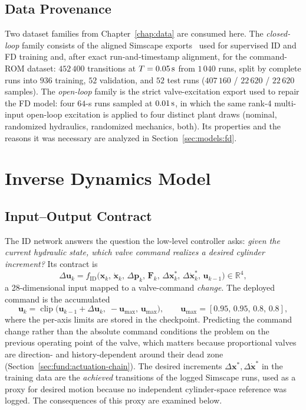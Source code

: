 \subsection{Data Provenance}

Two dataset families from Chapter~\ref{chap:data} are consumed here. The
\emph{closed-loop} family consists of the aligned Simscape
exports~\cite{mathworks2024simscape} used for supervised ID and FD training
and, after exact run-and-timestamp alignment, for the command-ROM dataset:
$452\,400$ transitions at $T=\unit[0.05]{s}$ from $1\,040$ runs, split by
complete runs into $936$ training, $52$ validation, and $52$ test runs
($407\,160$ / $22\,620$ / $22\,620$ samples). The \emph{open-loop} family is
the strict valve-excitation export used to repair the FD model: four $64$-s
runs sampled at $\unit[0.01]{s}$, in which the same rank-4 multi-input
open-loop excitation is applied to four distinct plant draws
(nominal, randomized hydraulics, randomized mechanics, both). Its properties
and the reasons it was necessary are analyzed in
Section~\ref{sec:models:fd}.

\section{Inverse Dynamics Model}
\label{sec:models:id}

\subsection{Input--Output Contract}

The ID network answers the question the low-level controller asks:
\emph{given the current hydraulic state, which valve command realizes a
desired cylinder increment?} Its contract is
%
\begin{equation}
  \label{eq:models:id-contract}
  \Delta\bm{u}_k = f_{\mathrm{ID}}
  \bigl(\bm{x}_k,\, \dot{\bm{x}}_k,\, \Delta\bm{p}_k,\, \bm{F}_k,\,
        \Delta\bm{x}^{*}_k,\, \Delta\dot{\bm{x}}^{*}_k,\, \bm{u}_{k-1}\bigr)
  \in \mathbb{R}^4 ,
\end{equation}
%
a 28-dimensional input mapped to a valve-command \emph{change}. The deployed
command is the accumulated
%
\begin{equation}
  \label{eq:models:id-apply}
  \bm{u}_k = \operatorname{clip}\bigl(\bm{u}_{k-1} + \Delta\bm{u}_k,\;
  -\bm{u}_{\max},\, \bm{u}_{\max}\bigr),
  \qquad \bm{u}_{\max} = [0.95,\, 0.95,\, 0.8,\, 0.8],
\end{equation}
%
where the per-axis limits are stored in the checkpoint. Predicting the
command change rather than the absolute command conditions the problem on the
previous operating point of the valve, which matters because proportional
valves are direction- and history-dependent around their dead zone
(Section~\ref{sec:fund:actuation-chain}). The desired increments
$\Delta\bm{x}^{*}, \Delta\dot{\bm{x}}^{*}$ in the training data are the
\emph{achieved} transitions of the logged Simscape runs, used as a proxy for
desired motion because no independent cylinder-space reference was logged.
The consequences of this proxy are examined below.

